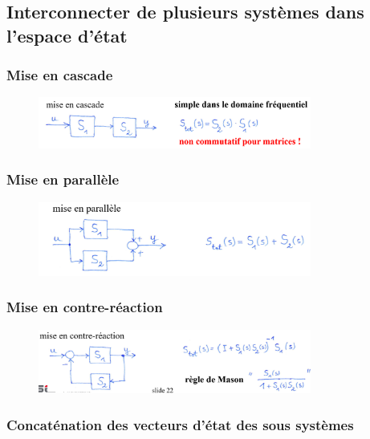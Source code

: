 \documentclass[document.tex]{subfiles}
\begin{document}
\subsection{Interconnecter de plusieurs systèmes dans l'espace d'état}

\subsubsection{Mise en cascade}
\begin{figure}[H]
    \centering
    \includegraphics[width=0.8\textwidth]{Include/Figure/21.png}
\end{figure}

\subsubsection{Mise en parallèle}
\begin{figure}[H]
    \centering
    \includegraphics[width=0.8\textwidth]{Include/Figure/22.png}
\end{figure}

\subsubsection{Mise en contre-réaction}
\begin{figure}[H]
    \centering
    \includegraphics[width=0.8\textwidth]{Include/Figure/23.png}
\end{figure}

\subsubsection{Concaténation des vecteurs d'état des sous systèmes}
\end{document}

